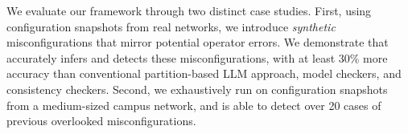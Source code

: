 We evaluate our framework through two distinct case studies.
First, using configuration snapshots from real networks, we introduce {\em synthetic} misconfigurations that mirror potential operator errors. 
We demonstrate that \sysname{} accurately infers and detects these misconfigurations, with at least 30\% more
accuracy than conventional partition-based LLM approach, model checkers, and consistency checkers.
Second, we exhaustively run \sysname{} on configuration snapshots from a medium-sized campus network, and \sysname{} is able to detect over 20 cases of previous overlooked misconfigurations.
